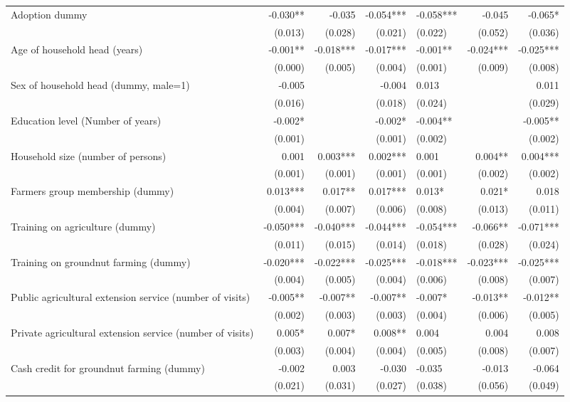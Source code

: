 \documentclass[
]{article}
\begin{document}
\begin{landscape}
\begin{longtable}[t]{lrrrlrr}
\endfoot
\bottomrule
\endlastfoot
Adoption dummy & -0.030** & -0.035 & -0.054*** & -0.058*** & -0.045 & -0.065*\\
 & (0.013) & (0.028) & (0.021) & (0.022) & (0.052) & (0.036)\\
Age of household head (years) & -0.001** & -0.018*** & -0.017*** & -0.001** & -0.024*** & -0.025***\\
 & (0.000) & (0.005) & (0.004) & (0.001) & (0.009) & (0.008)\\
Sex of household head (dummy, male=1) & -0.005 &  & -0.004 & 0.013 &  & 0.011\\
 & (0.016) &  & (0.018) & (0.024) &  & (0.029)\\
Education level (Number of years) & -0.002* &  & -0.002* & -0.004** &  & -0.005**\\
 & (0.001) &  & (0.001) & (0.002) &  & (0.002)\\
Household size (number of persons) & 0.001 & 0.003*** & 0.002*** & 0.001 & 0.004** & 0.004***\\
 & (0.001) & (0.001) & (0.001) & (0.001) & (0.002) & (0.002)\\
Farmers group membership (dummy) & 0.013*** & 0.017** & 0.017*** & 0.013* & 0.021* & 0.018\\
 & (0.004) & (0.007) & (0.006) & (0.008) & (0.013) & (0.011)\\
Training on agriculture (dummy) & -0.050*** & -0.040*** & -0.044*** & -0.054*** & -0.066** & -0.071***\\
 & (0.011) & (0.015) & (0.014) & (0.018) & (0.028) & (0.024)\\
Training on groundnut farming (dummy) & -0.020*** & -0.022*** & -0.025*** & -0.018*** & -0.023*** & -0.025***\\
 & (0.004) & (0.005) & (0.004) & (0.006) & (0.008) & (0.007)\\
Public agricultural extension service (number of visits) & -0.005** & -0.007** & -0.007** & -0.007* & -0.013** & -0.012**\\
 & (0.002) & (0.003) & (0.003) & (0.004) & (0.006) & (0.005)\\
Private agricultural extension service (number of visits) & 0.005* & 0.007* & 0.008** & 0.004 & 0.004 & 0.008\\
 & (0.003) & (0.004) & (0.004) & (0.005) & (0.008) & (0.007)\\
Cash credit for groundnut farming (dummy) & -0.002 & 0.003 & -0.030 & -0.035 & -0.013 & -0.064\\
 & (0.021) & (0.031) & (0.027) & (0.038) & (0.056) & (0.049)\\

\end{longtable}
\end{landscape}
\end{document}
